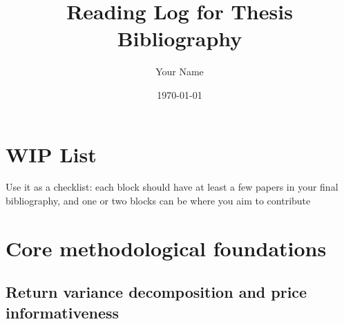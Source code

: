 \documentclass[11pt,a4paper]{article}
\begin{document}
\title{Reading Log for Thesis Bibliography}
\author{Your Name}
\date{\today}
\maketitle

\section{WIP List}
Use it as a checklist: each block should have at least a few papers in your final bibliography, and one or two blocks can be where you aim to contribute

\section{Core methodological foundations}

\subsection{Return variance decomposition and price informativeness}
\end{document}
